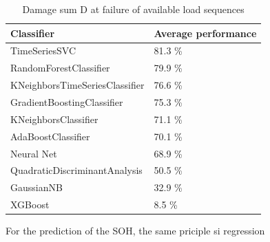 \begin{table}
	\begin{center}
		\begin{tabular}{|| l | l ||}
			\hline
			\rule{0pt}{2ex}Classifier & Average performance\\
			\hline
			\hline
			\rule{0pt}{2ex}TimeSeriesSVC & 81.3 \%\\	\hline
			RandomForestClassifier & 79.9 \% \\ \hline
			KNeighborsTimeSeriesClassifier & 76.6 \%\\ \hline
			GradientBoostingClassifier & 75.3 \%\\ \hline
			KNeighborsClassifier & 71.1 \%\\ \hline
			AdaBoostClassifier & 70.1 \% \\ \hline
			Neural Net & 68.9 \% \\ \hline
			QuadraticDiscriminantAnalysis & 50.5 \% \\ \hline
			GaussianNB & 32.9 \% \\ \hline
			XGBoost & 8.5 \% \\ \hline
			\hline
		\end{tabular}
		\caption{Damage sum D at failure of available load sequences}
		\label{score}
	\end{center}
	\vspace{-4mm}
\end{table}

For the prediction of the SOH, the same priciple si  regression 